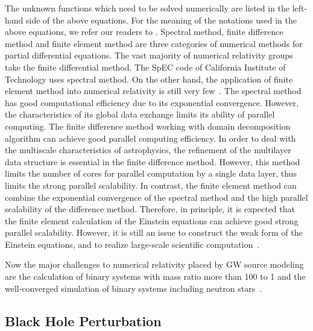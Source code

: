 \documentclass[a4paper,11pt]{article}
\begin{document}
The unknown functions which need to be solved numerically are listed in the left-hand side of the above equations. For the meaning of the notations used in the above equations, we refer our readers to \cite{Cao:2011fu}. Spectral method, finite difference method and finite element method are three categories of numerical methods for partial differential equations. The vast majority of numerical relativity groups take the finite differential method. The SpEC code of California Institute of Technology uses spectral method. On the other hand, the application of finite element method into  numerical relativity is still very few~\cite{Cao:2015via}. The spectral method has good computational efficiency due to its exponential convergence. However, the characteristics of its global data exchange limits its ability of parallel computing. The finite difference method working with domain decomposition algorithm can achieve good parallel computing efficiency. In order to deal with the multiscale characteristics of astrophysics, the refinement of the multilayer data structure is essential in the finite difference method. However, this method limits the number of cores for parallel computation by a single data layer, thus limits the strong parallel scalability. In contrast, the finite element method can combine the exponential convergence of the spectral method and the high parallel scalability of the difference method. Therefore, in principle, it is expected that the finite element calculation of the Einstein equations can achieve good strong parallel scalability. However, it is still an issue to construct the weak form of the Einstein equations, and to realize large-scale scientific computation~\cite{cao2016numerical,cai2016gravitational}.

Now the major challenges to numerical relativity placed by GW source modeling are the calculation of binary systems with mass ratio more than 100 to 1 and the well-converged simulation of binary systems including neutron stars~\cite{cao2016gravitational}.

\subsection{Black Hole Perturbation}
\label{subsec:BHperturb}
\end{document}
